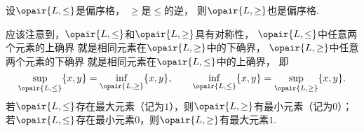 \begin{proposition}
设\(\opair{L,\leq}\)是偏序格，
\(\geq\)是\(\leq\)的逆，
则\(\opair{L,\geq}\)也是偏序格.
\end{proposition}

应该注意到，\(\opair{L,\leq}\)和\(\opair{L,\geq}\)具有对称性，
\(\opair{L,\leq}\)中任意两个元素的上确界
就是相同元素在\(\opair{L,\geq}\)中的下确界，
\(\opair{L,\geq}\)中任意两个元素的下确界
就是相同元素在\(\opair{L,\leq}\)中的上确界，
即\[
	\sup_{\opair{L,\leq}}\{x,y\}
	= \inf_{\opair{L,\geq}}\{x,y\},
	\qquad
	\inf_{\opair{L,\leq}}\{x,y\}
	= \sup_{\opair{L,\geq}}\{x,y\}.
\]
若\(\opair{L,\leq}\)存在最大元素（记为\(1\)），则\(\opair{L,\geq}\)有最小元素（记为\(0\)）；
若\(\opair{L,\leq}\)存在最小元素\(0\)，则\(\opair{L,\geq}\)有最大元素\(1\).
